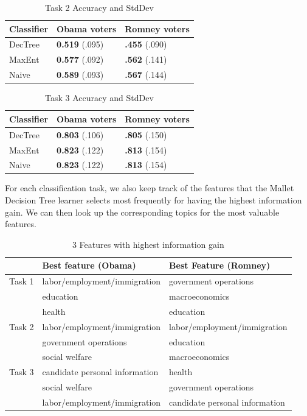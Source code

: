 \begin{table}[H]
\begin{centering}
\begin{tabular}{ l | l | l }
Classifier & Obama voters & Romney voters \\
\hline
DecTree & \textbf{0.519} (.095) &  \textbf{.455} (.090) \\
MaxEnt & \textbf{0.577} (.092) &  \textbf{.562} (.141) \\
Naive & \textbf{0.589} (.093) &  \textbf{.567} (.144) \\
\end{tabular}
\caption{Task 2 Accuracy and StdDev}
\end{centering}
\end{table}

\begin{table}[H]
\begin{centering}
\begin{tabular}{ l | l | l }
Classifier & Obama voters & Romney voters \\
\hline
DecTree & \textbf{0.803} (.106) &  \textbf{.805} (.150) \\
MaxEnt & \textbf{0.823} (.122) &  \textbf{.813} (.154) \\
Naive & \textbf{0.823} (.122) &  \textbf{.813} (.154) \\
\end{tabular}
\caption{Task 3 Accuracy and StdDev}
\label{tab:task3boydstun}
\end{centering}
\end{table}

For each classification task, we also keep track of the features that the Mallet Decision Tree learner selects most frequently for having the highest information gain. We can then look up the corresponding topics for the most valuable features.

\begin{table}[H]
\begin{centering}
\begin{tabular}{| l | l | l |}
\hline
  & Best feature (Obama) & Best Feature (Romney) \\
\hline
Task 1 & labor/employment/immigration & government operations \\
	    & education & macroeconomics \\
	    & health & education \\
	    \hline
Task 2 & labor/employment/immigration & labor/employment/immigration \\
	    & government operations & education \\
	    & social welfare & macroeconomics  \\
	    \hline
Task 3 & candidate personal information & health \\
	    & social welfare & government operations \\
	    & labor/employment/immigration & candidate personal information \\
	    \hline
\end{tabular}
\caption{3 Features with highest information gain}
\end{centering}
\end{table}


